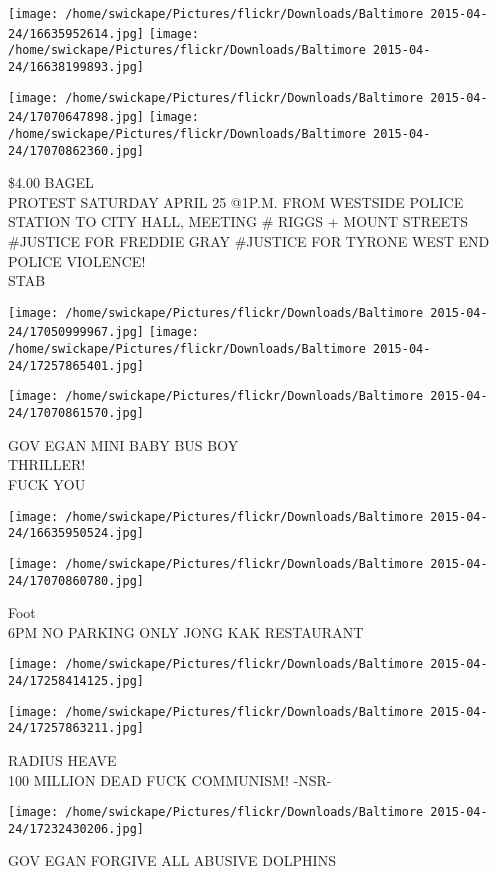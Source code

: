 \documentclass[10pt,letterpaper]{article}
\begin{document}
\texttt{[image: /home/swickape/Pictures/flickr/Downloads/Baltimore 2015-04-24/16635952614.jpg]}
\texttt{[image: /home/swickape/Pictures/flickr/Downloads/Baltimore 2015-04-24/16638199893.jpg]}

\texttt{[image: /home/swickape/Pictures/flickr/Downloads/Baltimore 2015-04-24/17070647898.jpg]}
\texttt{[image: /home/swickape/Pictures/flickr/Downloads/Baltimore 2015-04-24/17070862360.jpg]}

\$4.00 BAGEL\\
PROTEST SATURDAY APRIL 25 @1P.M. FROM WESTSIDE POLICE STATION TO CITY HALL, MEETING \# RIGGS + MOUNT STREETS\\
\#JUSTICE FOR FREDDIE GRAY \#JUSTICE FOR TYRONE WEST END POLICE VIOLENCE!\\
STAB\\
\pagebreak

\texttt{[image: /home/swickape/Pictures/flickr/Downloads/Baltimore 2015-04-24/17050999967.jpg]}
\texttt{[image: /home/swickape/Pictures/flickr/Downloads/Baltimore 2015-04-24/17257865401.jpg]}

\texttt{[image: /home/swickape/Pictures/flickr/Downloads/Baltimore 2015-04-24/17070861570.jpg]}

GOV EGAN MINI BABY BUS BOY\\
THRILLER!\\
FUCK YOU\\
\pagebreak

\texttt{[image: /home/swickape/Pictures/flickr/Downloads/Baltimore 2015-04-24/16635950524.jpg]}

\vspace{0.25in}
\texttt{[image: /home/swickape/Pictures/flickr/Downloads/Baltimore 2015-04-24/17070860780.jpg]}

Foot\\
6PM NO PARKING ONLY JONG KAK RESTAURANT\\
\pagebreak

\texttt{[image: /home/swickape/Pictures/flickr/Downloads/Baltimore 2015-04-24/17258414125.jpg]}

\vspace{0.25in}
\texttt{[image: /home/swickape/Pictures/flickr/Downloads/Baltimore 2015-04-24/17257863211.jpg]}

RADIUS HEAVE\\
100 MILLION DEAD FUCK COMMUNISM!  {-}NSR{-}\\
\pagebreak

\texttt{[image: /home/swickape/Pictures/flickr/Downloads/Baltimore 2015-04-24/17232430206.jpg]}

GOV EGAN FORGIVE ALL ABUSIVE DOLPHINS\\
\pagebreak
\end{document}
